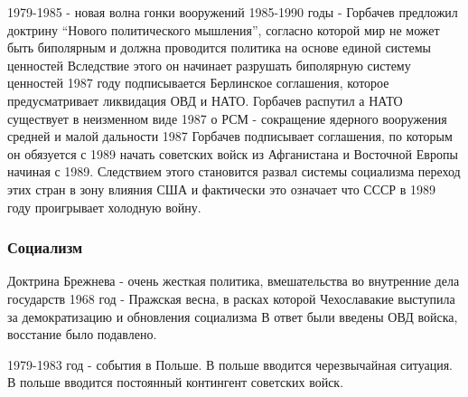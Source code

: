 \documentclass[a4paper]{article}
\begin{document}
1979-1985 - новая волна гонки вооружений
1985-1990 годы - Горбачев предложил доктрину ``Нового политического мышления'', согласно которой мир не может быть биполярным и должна проводится политика на основе единой системы ценностей
Вследствие этого он начинает разрушать биполярную систему ценностей
1987 году подписывается Берлинское соглашения, которое предусматривает ликвидация ОВД и НАТО. Горбачев распутил а НАТО существует в неизменном виде
1987 о РСМ - сокращение ядерного вооружения средней и малой дальности
1987 Горбачев подписывает соглашения, по которым он обязуется с 1989 начать советских войск из Афганистана и Восточной Европы начиная с 1989.
Следствием этого становится развал системы социализма переход этих стран в зону влияния США и фактически это означает что СССР в 1989 году проигрывает холодную войну.

\subsubsection{Социализм}
Доктрина Брежнева - очень жесткая политика, вмешательства во внутренние дела государств
1968 год - Пражская весна, в расках которой Чехославакие выступила за демократизацию и обновления социализма
В ответ были введены ОВД войска, восстание было подавлено.

1979-1983 год - события в Польше. В польше вводится черезвычайная ситуация. В польше вводится постоянный контингент советских войск.
\end{document}
